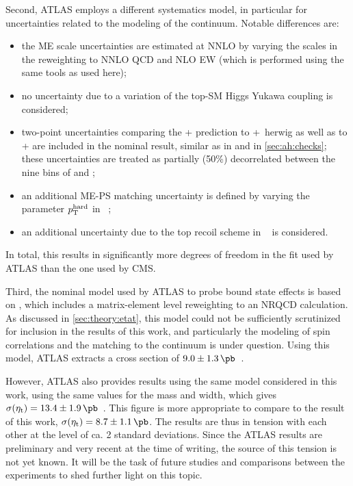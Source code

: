 Second, ATLAS employs a different systematics model, in particular for uncertainties related to the modeling of the \ttbar continuum. Notable differences are:
\begin{itemize}
\item the ME scale uncertainties are estimated at NNLO by varying the scales in the reweighting to NNLO QCD and NLO EW (which is performed using the same tools as used here);
\item no uncertainty due to a variation of the top-SM Higgs Yukawa coupling is considered;
\item two-point uncertainties comparing the \hvq+ \pythia prediction to \hvq+\ herwig as well as to \bbfourl+ \pythia are included in the nominal result, similar as in  and in \cref{sec:ah:checks}; these uncertainties are treated as partially (50\%) decorrelated between the nine bins of \chel and \chan;
\item an additional ME-PS matching uncertainty is defined by varying the parameter $p_{\mathrm{T}}^{\mathrm{hard}}$ in \pythia~\cite{Pythia:2022};
\item an additional uncertainty due to the top recoil scheme in \pythia~\cite{Brooks:2019xso} is considered.
\end{itemize}
In total, this results in significantly more degrees of freedom in the fit used by ATLAS than the one used by CMS.

Third, the nominal model used by ATLAS to probe \ttbar bound state effects is based on , which includes a matrix-element level reweighting to an NRQCD calculation. As discussed in \cref{sec:theory:etat}, this model could not be sufficiently scrutinized for inclusion in the results of this work, and particularly the modeling of spin correlations and the matching to the \ttbar continuum is under question. Using this model, ATLAS extracts a cross section of $9.0 \pm \SI{1.3}{\pb}$~\cite{ATLAS:CONF-2025-008}. 

However, ATLAS also provides results using the same \etat model considered in this work, using the same values for the \etat mass and width, which gives $\sigetat = 13.4 \pm \SI{1.9}{\pb}$~\cite{ATLAS:CONF-2025-008}. This figure is more appropriate to compare to the result of this work, $\sigetat = 8.7 \pm \SI{1.1}{\pb}$. The results are thus in tension with each other at the level of ca. 2 standard deviations. Since the ATLAS results are preliminary and very recent at the time of writing, the source of this tension is not yet known. It will be the task of future studies and comparisons between the experiments to shed further light on this topic.


